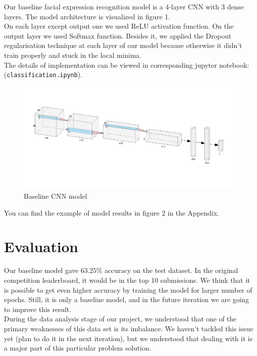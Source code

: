 Our baseline facial expression recognition model is a 4-layer CNN with 3 dense layers. The model architecture is visualized in figure 1.\\

On each layer except output one we used ReLU activation function. On the output layer we used Softmax function. Besides it, we applied the Dropout regularisation technique at each layer of our model because otherwise it didn't train properly and stuck in the local minima. \\

The details of implementation can be viewed in corresponding jupyter notebook: (\texttt{classification.ipynb}).\\

\begin{figure}
	\centering
	\includegraphics[width=\textwidth]{../images/baseline-architecture.png}
	\caption{Baseline CNN model}
\end{figure}

You can find the example of model results in figure 2 in the Appendix.

\section{Evaluation}

Our baseline model gave $63.25\%$ accuracy on the test dataset. In the original competition leaderboard, it would be in the top 10 submissions. We think that it is possible to get even higher accuracy by training the model for larger number of epochs. Still, it is only a baseline model, and in the future iteration we are going to improve this result.\\ 

During the data analysis stage of our project, we understood that one of the primary weaknesses of this data set is its imbalance. We haven't tackled this issue yet (plan to do it in the next iteration), but we understood that dealing with it is a major part of this particular problem solution.\\

